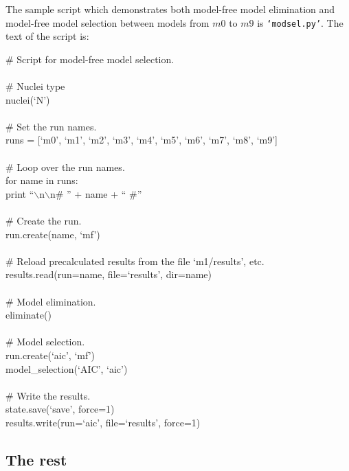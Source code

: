 The sample script which demonstrates both model-free model elimination and model-free model selection between models from $m0$ to $m9$ is \texttt{`modsel.py'}.  The text of the script is:

\begin{exampleenv}
\# Script for model-free model selection. \\
 \\
\# Nuclei type \\
nuclei(`N') \\
 \\
\# Set the run names. \\
runs = [`m0', `m1', `m2', `m3', `m4', `m5', `m6', `m7', `m8', `m9'] \\
 \\
\# Loop over the run names. \\
for name in runs: \\
\hspace*{4ex} print ``$\backslash$n$\backslash$n\# '' + name + `` \#'' \\
 \\
\hspace*{4ex} \# Create the run. \\
\hspace*{4ex} run.create(name, `mf') \\
 \\
\hspace*{4ex} \# Reload precalculated results from the file `m1/results', etc. \\
\hspace*{4ex} results.read(run=name, file=`results', dir=name) \\
 \\
\# Model elimination. \\
eliminate() \\
 \\
\# Model selection. \\
run.create(`aic', `mf') \\
model\_selection(`AIC', `aic') \\
 \\
\# Write the results. \\
state.save(`save', force=1) \\
results.write(run=`aic', file=`results', force=1)
\end{exampleenv}



\subsection{The rest}

